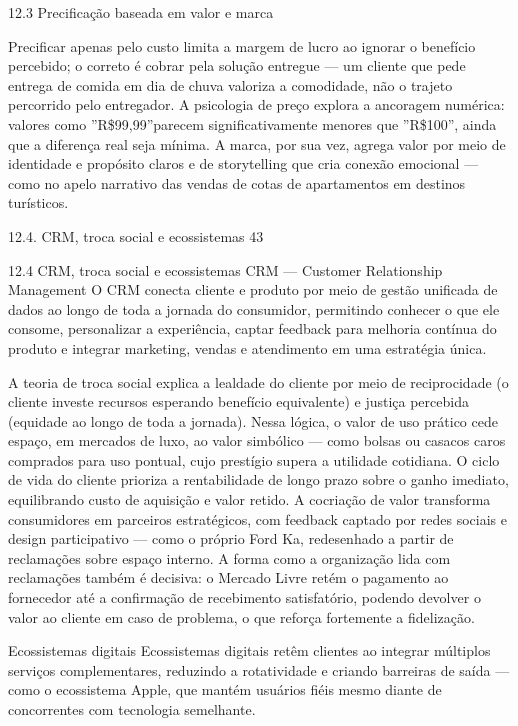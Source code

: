 12.3 Precificação baseada em valor e marca

Precificar apenas pelo custo limita a margem de lucro ao ignorar o benefício percebido; o correto é cobrar pela solução entregue — um cliente que pede entrega de comida em dia de chuva valoriza a comodidade, não o trajeto percorrido pelo entregador. A psicologia de preço explora a ancoragem numérica: valores como ”R\$99,99”parecem significativamente menores que ”R\$100”, ainda que a diferença real seja mínima. A marca, por sua vez, agrega valor por meio de identidade e propósito claros e de storytelling que cria conexão emocional — como no apelo narrativo das vendas de cotas de apartamentos em destinos turísticos.

12.4. CRM, troca social e ecossistemas 43

12.4 CRM, troca social e ecossistemas CRM — Customer Relationship Management O CRM conecta cliente e produto por meio de gestão unificada de dados ao longo de toda a jornada do consumidor, permitindo conhecer o que ele consome, personalizar a experiência, captar feedback para melhoria contínua do produto e integrar marketing, vendas e atendimento em uma estratégia única.

A teoria de troca social explica a lealdade do cliente por meio de reciprocidade (o cliente investe recursos esperando benefício equivalente) e justiça percebida (equidade ao longo de toda a jornada). Nessa lógica, o valor de uso prático cede espaço, em mercados de luxo, ao valor simbólico — como bolsas ou casacos caros comprados para uso pontual, cujo prestígio supera a utilidade cotidiana. O ciclo de vida do cliente prioriza a rentabilidade de longo prazo sobre o ganho imediato, equilibrando custo de aquisição e valor retido. A cocriação de valor transforma consumidores em parceiros estratégicos, com feedback captado por redes sociais e design participativo — como o próprio Ford Ka, redesenhado a partir de reclamações sobre espaço interno. A forma como a organização lida com reclamações também é decisiva: o Mercado Livre retém o pagamento ao fornecedor até a confirmação de recebimento satisfatório, podendo devolver o valor ao cliente em caso de problema, o que reforça fortemente a fidelização.

Ecossistemas digitais Ecossistemas digitais retêm clientes ao integrar múltiplos serviços complementares, reduzindo a rotatividade e criando barreiras de saída — como o ecossistema Apple, que mantém usuários fiéis mesmo diante de concorrentes com tecnologia semelhante.

